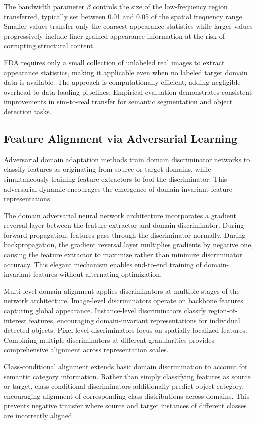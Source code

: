 The bandwidth parameter $\beta$ controls the size of the low-frequency region transferred, typically set between 0.01 and 0.05 of the spatial frequency range. Smaller values transfer only the coarsest appearance statistics while larger values progressively include finer-grained appearance information at the risk of corrupting structural content.

FDA requires only a small collection of unlabeled real images to extract appearance statistics, making it applicable even when no labeled target domain data is available. The approach is computationally efficient, adding negligible overhead to data loading pipelines. Empirical evaluation demonstrates consistent improvements in sim-to-real transfer for semantic segmentation and object detection tasks.

\subsection{Feature Alignment via Adversarial Learning}

Adversarial domain adaptation methods train domain discriminator networks to classify features as originating from source or target domains, while simultaneously training feature extractors to fool the discriminator. This adversarial dynamic encourages the emergence of domain-invariant feature representations.

The domain adversarial neural network architecture incorporates a gradient reversal layer between the feature extractor and domain discriminator. During forward propagation, features pass through the discriminator normally. During backpropagation, the gradient reversal layer multiplies gradients by negative one, causing the feature extractor to maximize rather than minimize discriminator accuracy. This elegant mechanism enables end-to-end training of domain-invariant features without alternating optimization.

Multi-level domain alignment applies discriminators at multiple stages of the network architecture. Image-level discriminators operate on backbone features capturing global appearance. Instance-level discriminators classify region-of-interest features, encouraging domain-invariant representations for individual detected objects. Pixel-level discriminators focus on spatially localized features. Combining multiple discriminators at different granularities provides comprehensive alignment across representation scales.

Class-conditional alignment extends basic domain discrimination to account for semantic category information. Rather than simply classifying features as source or target, class-conditional discriminators additionally predict object category, encouraging alignment of corresponding class distributions across domains. This prevents negative transfer where source and target instances of different classes are incorrectly aligned.

